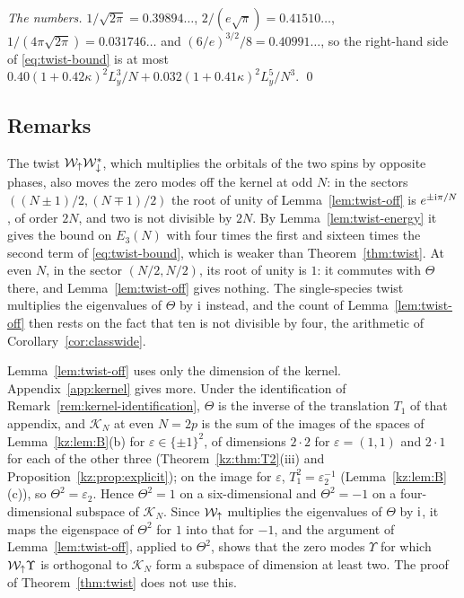 \emph{The numbers.} $1/\sqrt{2\pi}=0.39894\ldots$, $2/(e\sqrt\pi)=0.41510\ldots$, $1/(4\pi\sqrt{2\pi})=0.031746\ldots$ and
$(6/e)^{3/2}/8=0.40991\ldots$, so the right-hand side of \eqref{eq:twist-bound} is at most
$0.40(1+0.42\kappa)^2L_y^3/N+0.032(1+0.41\kappa)^2L_y^5/N^3$. \qed

\subsection{Remarks}

\begin{remark}\label{rem:twist-two}
The twist $\mathcal W_{\uparrow}\mathcal W_{\downarrow}^*$, which multiplies the orbitals of the two spins by opposite phases, also moves the zero
modes off the kernel at odd $N$: in the sectors $((N\pm1)/2,(N\mp1)/2)$ the root of unity of
Lemma~\ref{lem:twist-off} is $e^{\pm\mathrm{i}\pi/N}$, of order $2N$, and two is not divisible by $2N$. By
Lemma~\ref{lem:twist-energy} it gives the bound on $E_3(N)$ with four times the first and sixteen times the second term
of \eqref{eq:twist-bound}, which is weaker than Theorem~\ref{thm:twist}. At even $N$, in the sector $(N/2,N/2)$, its root
of unity is $1$: it commutes with $\Theta$ there, and Lemma~\ref{lem:twist-off} gives nothing. The single-species twist
multiplies the eigenvalues of $\Theta$ by $\mathrm{i}$ instead, and the count of Lemma~\ref{lem:twist-off} then rests on the fact
that ten is not divisible by four, the arithmetic of Corollary~\ref{cor:classwide}.
\end{remark}

\begin{remark}\label{rem:twist-kernel}
Lemma~\ref{lem:twist-off} uses only the dimension of the kernel. Appendix~\ref{app:kernel} gives more. Under the
identification of Remark~\ref{rem:kernel-identification}, $\Theta$ is the inverse of the translation $T_1$ of that
appendix, and $\mathcal K_N$ at even $N=2p$ is the sum of the images of the spaces of Lemma~\ref{kz:lem:B}(b) for
$\varepsilon\in\{\pm1\}^2$, of dimensions $2\cdot2$ for $\varepsilon=(1,1)$ and $2\cdot1$ for each of the other three
(Theorem~\ref{kz:thm:T2}(iii) and Proposition~\ref{kz:prop:explicit}); on the image for $\varepsilon$,
$T_1^2=\varepsilon_2^{-1}$ (Lemma~\ref{kz:lem:B}(c)), so $\Theta^2=\varepsilon_2$. Hence $\Theta^2=1$ on a six-dimensional and
$\Theta^2=-1$ on a four-dimensional subspace of $\mathcal K_N$. Since $\mathcal W_{\uparrow}$ multiplies the eigenvalues of $\Theta$ by $\mathrm{i}$,
it maps the eigenspace of $\Theta^2$ for $1$ into that for $-1$, and the argument of Lemma~\ref{lem:twist-off}, applied to
$\Theta^2$, shows that the zero modes $\Upsilon$ for which $\mathcal W_{\uparrow}\Upsilon$ is orthogonal to $\mathcal K_N$ form a subspace of
dimension at least two. The proof of Theorem~\ref{thm:twist} does not use this.
\end{remark}

